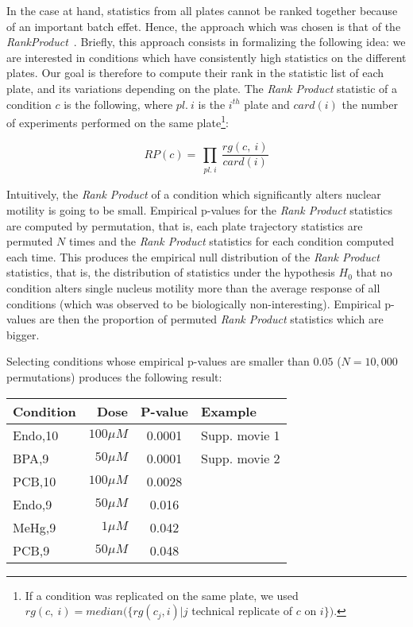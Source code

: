 In the case at hand, statistics from all plates cannot be ranked together because of an important batch effet. Hence, the approach which was chosen is that of the \textit{RankProduct}~\cite{pmid15327980}. Briefly, this approach consists in formalizing the following idea: we are interested in conditions which have consistently high statistics on the different plates. Our goal is therefore to compute their rank in the statistic list of each plate, and its variations depending on the plate. The \textit{Rank Product} statistic of a condition $c$ is the following, where $pl.~i$ is the $i^{th}$ plate and $card(i)$ the number of experiments performed on the same plate\footnote{If a condition was replicated on the same plate, we used\\
 $rg(c,~i)=median(\{ rg(c_j,i)|j$ technical replicate of $c$ on $i\} )$.}: 

\[RP(c) = \prod_{\substack{pl.~i}} \dfrac{rg(c,~i)}{card(i)} \]

Intuitively, the \textit{Rank Product} of a condition which significantly alters nuclear motility is going to be small. Empirical p-values for the \textit{Rank Product} statistics are computed by permutation, that is, each plate trajectory statistics are permuted $N$ times and the \textit{Rank Product} statistics for each condition computed each time. This produces the empirical null distribution of the \textit{Rank Product} statistics, that is, the distribution of statistics under the hypothesis $H_0$ that no condition alters single nucleus motility more than the average response of all conditions (which was observed to be biologically non-interesting). Empirical p-values are then the proportion of permuted \textit{Rank Product} statistics which are bigger.

Selecting conditions whose empirical p-values are smaller than $0.05$ ($N=10,000$ permutations) produces the following result:
\begin{table}[!ht]
\centering
\begin{tabular}{|l|r|c|l|}
\hline
Condition & Dose & P-value & Example\\
\hline
Endo,10 &$100\mu M$ &0.0001&Supp. movie 1\\
BPA,9 &$50\mu M$ &0.0001 & Supp. movie 2\\
PCB,10 & $100\mu M$ &0.0028&\\
Endo,9 & $50\mu M$ &0.016&\\
MeHg,9 & $1\mu M$&	0.042&\\
PCB,9 & $50\mu M$ &0.048&\\
\hline
\end{tabular}
\end{table} 				%

